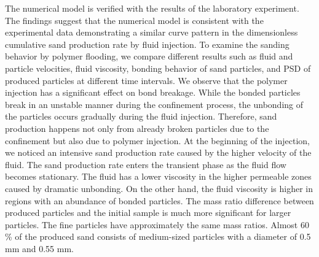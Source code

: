 \documentclass{article}
\begin{document}
The numerical model is verified with the results of the laboratory experiment. The findings suggest that the numerical model is consistent with the experimental data demonstrating a similar curve pattern in the dimensionless cumulative sand production rate by fluid injection. To examine the sanding behavior by polymer flooding, we compare different results such as fluid and particle velocities, fluid viscosity, bonding behavior of sand particles, and PSD of produced particles at different time intervals. We observe that the polymer injection has a significant effect on bond breakage. While the bonded particles break in an unstable manner during the confinement process, the unbonding of the particles occurs gradually during the fluid injection. Therefore, sand production happens not only from already broken particles due to the confinement but also due to polymer injection. At the beginning of the injection, we noticed an intensive sand production rate caused by the higher velocity of the fluid. The sand production rate enters the transient phase as the fluid flow becomes stationary. The fluid has a lower viscosity in the higher permeable zones caused by dramatic unbonding. On the other hand, the fluid viscosity is higher in regions with an abundance of bonded particles. The mass ratio difference between produced particles and the initial sample is much more significant for larger particles. The fine particles have approximately the same mass ratios. Almost 60 \% of the produced sand consists of medium-sized particles with a diameter of 0.5 mm and 0.55 mm. 
\end{document}

